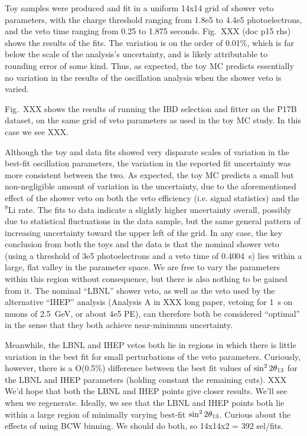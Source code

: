 \documentclass[../thesis.tex]{subfiles}
\begin{document}
Toy samples were produced and fit in a uniform 14x14 grid of shower veto parameters, with the charge threshold ranging from 1.8e5 to 4.4e5 photoelectrons, and the veto time ranging from 0.25 to 1.875 seconds. Fig.~XXX (doc p15 rhs) shows the results of the fits. The variation is on the order of 0.01\%, which is far below the scale of the analysis's uncertainty, and is likely attributable to rounding error of some kind. Thus, as expected, the toy MC predicts essentially no variation in the results of the oscillation analysis when the shower veto is varied.

Fig.~XXX shows the results of running the IBD selection and fitter on the P17B dataset, on the same grid of veto parameters as used in the toy MC study. In this case we see XXX.

Although the toy and data fits showed very disparate scales of variation in the best-fit oscillation parameters, the variation in the reported fit uncertainty was more consistent between the two. As expected, the toy MC predicts a small but non-negligible amount of variation in the uncertainty, due to the aforementioned effect of the shower veto on both the veto efficiency (i.e. signal statistics) and the $^9$Li rate. The fits to data indicate a slightly higher uncertainty overall, possibly due to statistical fluctuations in the data sample, but the same general pattern of increasing uncertainty toward the upper left of the grid. In any case, the key conclusion from both the toys and the data is that the nominal shower veto (using a threshold of 3e5 photoelectrons and a veto time of 0.4004~s) lies within a large, flat valley in the parameter space. We are free to vary the parameters within this region without consequence, but there is also nothing to be gained from it. The nominal ``LBNL'' shower veto, as well as the veto used by the alternative ``IHEP'' analysis (Analysis A in XXX long paper, vetoing for 1~s on muons of 2.5~GeV, or about 4e5 PE), can therefore both be considered ``optimal'' in the sense that they both achieve near-minimum uncertainty.

Meanwhile, the LBNL and IHEP vetos both lie in regions in which there is little variation in the best fit for small perturbations of the veto parameters. Curiously, however, there is a O(0.5\%) difference between the best fit values of $\sin^2 2\theta_{13}$ for the LBNL and IHEP parameters (holding constant the remaining cuts). XXX We'd hope that both the LBNL and IHEP points give closer results. We'll see when we regenerate. Ideally, we see that the LBNL and IHEP points both lie within a large region of minimally varying best-fit $\sin^2 2\theta_{13}$. Curious about the effects of using BCW binning. We should do both, so 14x14x2 = 392 sel/fits.
\end{document}
